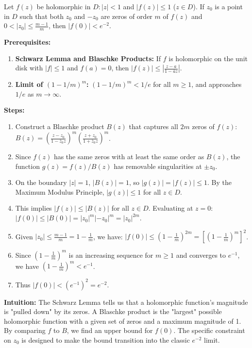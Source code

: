\begin{exercise}
\label{analysis:2010:3}
Let $f(z)$ be holomorphic in $D: |z| < 1$ and $|f(z)| \leq 1$ ($z \in D$). If $z_0$ is a point in $D$ such that both $z_0$ and $-z_0$ are zeros of order $m$ of $f(z)$ and $0 < |z_0| \leq \frac{m-1}{m}$, then $|f(0)| < e^{-2}$.
\end{exercise}

\begin{solution}
\textbf{Prerequisites:}
\begin{enumerate}
    \item \textbf{Schwarz Lemma and Blaschke Products:} If $f$ is holomorphic on the unit disk with $|f| \leq 1$ and $f(a) = 0$, then $|f(z)| \leq | \frac{z-a}{1-\bar{a}z} |$.
    \item \textbf{Limit of $(1-1/m)^m$:} $(1-1/m)^m < 1/e$ for all $m \geq 1$, and approaches $1/e$ as $m \to \infty$.
\end{enumerate}

\textbf{Steps:}
\begin{enumerate}
    \item Construct a Blaschke product $B(z)$ that captures all $2m$ zeros of $f(z)$:
       $B(z) = \left( \frac{z-z_0}{1-\bar{z}_0z} \right)^m \left( \frac{z+z_0}{1+\bar{z}_0z} \right)^m$.
    \item Since $f(z)$ has the same zeros with at least the same order as $B(z)$, the function $g(z) = f(z)/B(z)$ has removable singularities at $\pm z_0$.
    \item On the boundary $|z| = 1$, $|B(z)| = 1$, so $|g(z)| = |f(z)| \leq 1$. By the Maximum Modulus Principle, $|g(z)| \leq 1$ for all $z \in D$.
    \item This implies $|f(z)| \leq |B(z)|$ for all $z \in D$. Evaluating at $z=0$:
       $|f(0)| \leq |B(0)| = |z_0|^m |-z_0|^m = |z_0|^{2m}$.
    \item Given $|z_0| \leq \frac{m-1}{m} = 1 - \frac{1}{m}$, we have:
       $|f(0)| \leq \left( 1 - \frac{1}{m} \right)^{2m} = \left[ \left( 1 - \frac{1}{m} \right)^m \right]^2$.
    \item Since $\left( 1 - \frac{1}{m} \right)^m$ is an increasing sequence for $m \geq 1$ and converges to $e^{-1}$, we have $\left( 1 - \frac{1}{m} \right)^m < e^{-1}$.
    \item Thus $|f(0)| < (e^{-1})^2 = e^{-2}$.
\end{enumerate}

\textbf{Intuition:}
The Schwarz Lemma tells us that a holomorphic function's magnitude is "pulled down" by its zeros. A Blaschke product is the "largest" possible holomorphic function with a given set of zeros and a maximum magnitude of 1. By comparing $f$ to $B$, we find an upper bound for $f(0)$. The specific constraint on $z_0$ is designed to make the bound transition into the classic $e^{-2}$ limit.
\end{solution}

